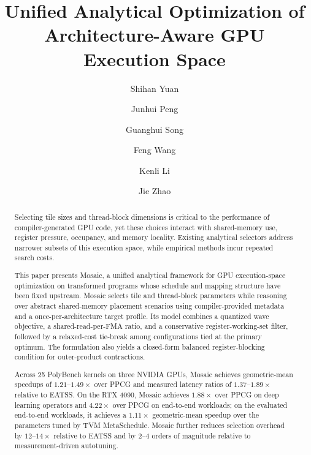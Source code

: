 \documentclass[acmsmall,review,anonymous,screen]{acmart}
\makeatletter
\newif\ifrevmarkup
\DeclareRobustCommand{\revO}[1]{\ifrevmarkup{\color{revO}\hypersetup{allcolors=revO}#1}\else#1\fi}
\DeclareRobustCommand{\revRone}[1]{\ifrevmarkup{\color{revRone}\hypersetup{allcolors=revRone}#1}\else#1\fi}
\DeclareRobustCommand{\revRthree}[1]{\ifrevmarkup{\color{revRthree}\hypersetup{allcolors=revRthree}#1}\else#1\fi}
\let\revO\@firstofone\let\revRone\@firstofone
\newcommand{\name}{{Mosaic}\xspace}
\makeatother
\begin{document}
\title[Analytical Optimization of Architecture-Aware GPU Code Generation]
{Unified Analytical Optimization of Architecture-Aware GPU Execution Space}

\author{Shihan Yuan}
\author{Junhui Peng}
\author{Guanghui Song}
\author{Feng Wang}
\author{Kenli Li}
\author{Jie Zhao}


\begin{abstract}
Selecting tile sizes and thread-block dimensions is critical to the performance of compiler-generated GPU code, yet these choices interact with shared-memory use, register pressure, occupancy, and memory locality. Existing analytical selectors address narrower subsets of this execution space, while empirical methods incur repeated search costs.

This paper presents \name, a unified analytical framework for GPU execution-space optimization on transformed programs whose schedule and mapping structure have been fixed upstream. \name selects tile and thread-block parameters while reasoning over abstract shared-memory placement scenarios using compiler-provided metadata and a once-per-architecture target profile. Its model combines a quantized wave objective, a shared-read-per-FMA ratio, and a conservative register-working-set filter, followed by a relaxed-cost tie-break among configurations tied at the primary optimum. The formulation also yields a closed-form balanced register-blocking condition for outer-product contractions.

Across 25 PolyBench kernels on three NVIDIA GPUs, \name achieves geometric-mean speedups of $1.21$--$1.49\times$ over PPCG and measured latency ratios of $1.37$--$1.89\times$ relative to \revO{the energy-aware }EATSS. On the RTX 4090, \name achieves $1.88\times$ over PPCG on deep learning operators and $4.22\times$ over PPCG on end-to-end workloads; on the evaluated end-to-end workloads, it achieves a $1.11\times$ geometric-mean speedup over \revRthree{the parameters tuned by }TVM MetaSchedule. \name further reduces selection overhead by $12$--$14\times$ relative to EATSS and by $2$--$4$ orders of magnitude relative to measurement-driven autotuning.
\end{abstract}
\end{document}
